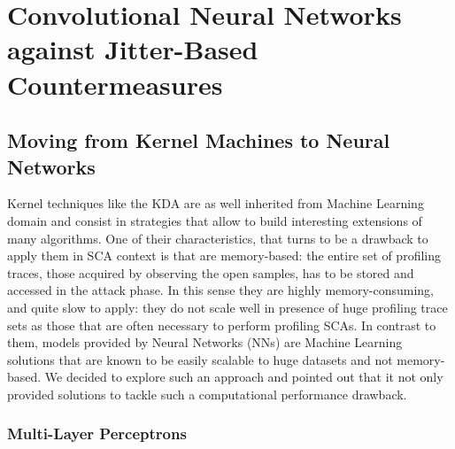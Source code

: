 
\chapter{Convolutional Neural Networks against Jitter-Based Countermeasures} %

\label{ChapterCNN}

\section{Moving from Kernel Machines to Neural Networks}

Kernel techniques like the KDA  are as well inherited from Machine Learning domain and consist in strategies that allow to build interesting extensions of many algorithms. One of their characteristics, that turns to be a drawback to apply them in SCA context is that are memory-based: the entire set of profiling traces, \ie those acquired by observing the open samples, has to be stored and accessed in the attack phase. In this sense they are highly memory-consuming, and quite slow to apply: they do not scale well in presence of huge profiling trace sets as those that are often necessary to perform profiling SCAs. In contrast to them, models provided by Neural Networks (NNs) are Machine Learning solutions that are known to be easily scalable to huge datasets and not memory-based. We decided to explore such an approach and pointed out that it not only provided solutions to tackle such a computational performance drawback.
\subsection{Multi-Layer Perceptrons}


